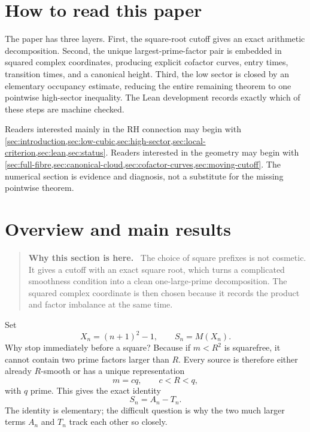 \documentclass[11pt]{article}
\theoremstyle{definition}
\theoremstyle{remark}
\newcommand{\1}{\mathbf{1}}
\newenvironment{motivation}
  {\begin{quote}\small\color{ovvogray}\textbf{Why this section is here.}\ }
  {\end{quote}}
\begin{document}
\section*{How to read this paper}
The paper has three layers.  First, the square-root cutoff gives an exact arithmetic decomposition.  Second, the unique largest-prime-factor pair is embedded in squared complex coordinates, producing explicit cofactor curves, entry times, transition times, and a canonical height.  Third, the low sector is closed by an elementary occupancy estimate, reducing the entire remaining theorem to one pointwise high-sector inequality.  The Lean development records exactly which of these steps are machine checked.

Readers interested mainly in the RH connection may begin with \cref{sec:introduction,sec:low-cubic,sec:high-sector,sec:local-criterion,sec:lean,sec:status}.  Readers interested in the geometry may begin with \cref{sec:full-fibre,sec:canonical-cloud,sec:cofactor-curves,sec:moving-cutoff}.  The numerical section is evidence and diagnosis, not a substitute for the missing pointwise theorem.

\medskip

\section{Overview and main results}
\label{sec:introduction}

\begin{motivation}
The choice of square prefixes is not cosmetic.  It gives a cutoff with an exact square root, which turns a complicated smoothness condition into a clean one-large-prime decomposition.  The squared complex coordinate is then chosen because it records the product and factor imbalance at the same time.
\end{motivation}

Set
\[
 X_n=(n+1)^2-1,\qquad S_n=M(X_n).
\]
Why stop immediately before a square?  Because if $m<R^2$ is squarefree, it cannot contain two prime factors larger than $R$.  Every source is therefore either already $R$-smooth or has a unique representation
\[
 m=cq,\qquad c<R<q,
\]
with $q$ prime.  This gives the exact identity
\[
 S_n=A_n-T_n.
\]
The identity is elementary; the difficult question is why the two much larger terms $A_n$ and $T_n$ track each other so closely.
\end{document}
